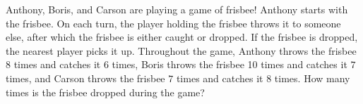 Anthony, Boris, and Carson are playing a game of frisbee! Anthony starts with the frisbee. On each turn, the player holding the frisbee throws it to someone else, after which the frisbee is either caught or dropped. If the frisbee is dropped, the nearest player picks it up. Throughout the game, Anthony throws the frisbee $8$ times and catches it $6$ times, Boris throws the frisbee 10 times and catches it $7$ times, and Carson throws the frisbee $7$ times and catches it $8$ times. How many times is the frisbee dropped during the game?

